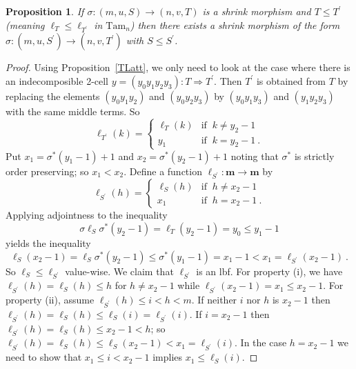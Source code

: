 \documentclass[a4paper,12pt,reqno]{amsart}
\def\red{\color{red}}
\newtheorem{proposition}[theorem]{Proposition}
\theoremstyle{definition}
\theoremstyle{fact}
\theoremstyle{genquest}
\theoremstyle{step}
\newcommand{\lra}{\longrightarrow}
\newcommand{\Lra}{\Longrightarrow}
\def\ordm{{\mathbf{m}}}
\begin{document}
\begin{proposition}
If $\sigma : (m,u,S) \lra (n,v,T)$ is a shrink morphism and $T \le T^{\prime}$
(meaning $\ell_T\le \ell_{T^{\prime}}$ in $\mathrm{Tam}_n$) then there
exists a shrink morphism of the form 
$\sigma : (m,u,S^{\prime}) \lra (n,v,T^{\prime})$ 
with $S\le S^{\prime}$. 
\end{proposition}
\begin{proof}
Using Proposition~\ref{TLatt}, we only need to look at the case where
there is an indecomposible 2-cell $y=(y_0y_1y_2y_3) : T\Lra T^{\prime}$. 
Then $T^{\prime}$ is obtained from $T$ by replacing the elements
$(y_0y_1y_2)$ and $(y_0y_2y_3)$ by $(y_0y_1y_3)$ and $(y_1y_2y_3)$
with the same middle terms. So
\begin{equation*}
  \ell_{T^{\prime}} (k) =
      \begin{cases}
          \ell_T (k) & \text{if } \  k \neq y_2-1  \\
           y_1 & \text{if } \ k = y_2-1 \ .
       \end{cases}
\end{equation*}
Put $x_1=\sigma^*(y_1-1)+1$ and $x_2=\sigma^*(y_2-1)+1$ noting
that $\sigma^*$ is strictly order preserving; so $x_1<x_2$. Define
a function $\ell_{S^{\prime}}:\ordm\lra\ordm$ by
\begin{equation*}
  \ell_{S^{\prime}} (h) =
      \begin{cases}
          \ell_S (h) & \text{if } \  h \neq x_2-1  \\
           x_1 & \text{if } \ h = x_2-1 \ .
       \end{cases}
\end{equation*}
Applying adjointness to the inequality
$$\sigma \ell_S \sigma^*(y_2-1)=\ell_T(y_2-1)=y_0\le y_1-1$$
yields the inequality
$$\ell_S(x_2-1)=\ell_S\sigma^*(y_2-1)\le \sigma^*(y_1-1)=x_1-1<x_1=\ell_{S^{\prime}}(x_2-1) \ .$$
So $\ell_S\le \ell_{S^{\prime}}$ value-wise.
We claim that $\ell_{S^{\prime}}$ is an lbf. 
For property (i), we have $\ell_{S^{\prime}}(h)=\ell_S(h)\le h$ for $h\neq x_2-1$
while $\ell_{S^{\prime}}(x_2-1)=x_1\le x_2-1$. For property (ii), assume
$\ell_{S^{\prime}}(h)\le i < h <m$. If neither $i$ nor $h$ is $x_2-1$ then
$\ell_{S^{\prime}}(h)=\ell_S(h) \le \ell_S(i)=\ell_{S^{\prime}}(i)$.
If $i=x_2-1$ then $\ell_{S^{\prime}}(h) = \ell_S(h) \le x_2-1<h$; so 
$\ell_{S^{\prime}}(h) = \ell_S(h) \le \ell_S(x_2-1) < x_1 = \ell_{S^{\prime}}(i)$.  
In the case $h=x_2-1$ we need to show that $x_1\le i < x_2-1$ implies 
$x_1\le \ell_S(i)$. 
\red{I am stuck at this point and maybe this approach is wrong. However, 
I hope Steve has a proof of this proposition.}
\end{proof}
\end{document}
